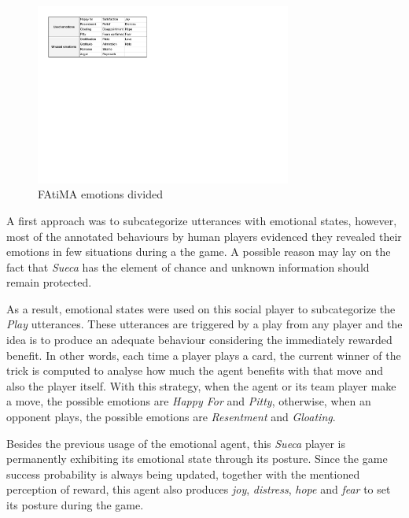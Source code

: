 \begin{figure}[ht]
	\centering
    \includegraphics[width=0.75\textwidth]{./img/emotions}
	\caption{FAtiMA emotions divided}
\label{fig:emotions}
\end{figure}

A first approach was to subcategorize utterances with emotional states, however, most of the annotated behaviours by human players evidenced they revealed their emotions in few situations during a the game.
A possible reason may lay on the fact that \emph{Sueca} has the element of chance and unknown information should remain protected.

As a result, emotional states were used on this social player to subcategorize the \emph{Play} utterances.
These utterances are triggered by a play from any player and the idea is to produce an adequate behaviour considering the immediately rewarded benefit.
In other words, each time a player plays a card, the current winner of the trick is computed to analyse how much the agent benefits with that move and also the player itself.
With this strategy, when the agent or its team player make a move, the possible emotions are \emph{Happy For} and \emph{Pitty}, otherwise, when an opponent plays, the possible emotions are \emph{Resentment} and \emph{Gloating}.

Besides the previous usage of the emotional agent, this \emph{Sueca} player is permanently exhibiting its emotional state through its posture.
Since the game success probability is always being updated, together with the mentioned perception of reward, this agent also produces \emph{joy}, \emph{distress}, \emph{hope} and \emph{fear} to set its posture during the game.


